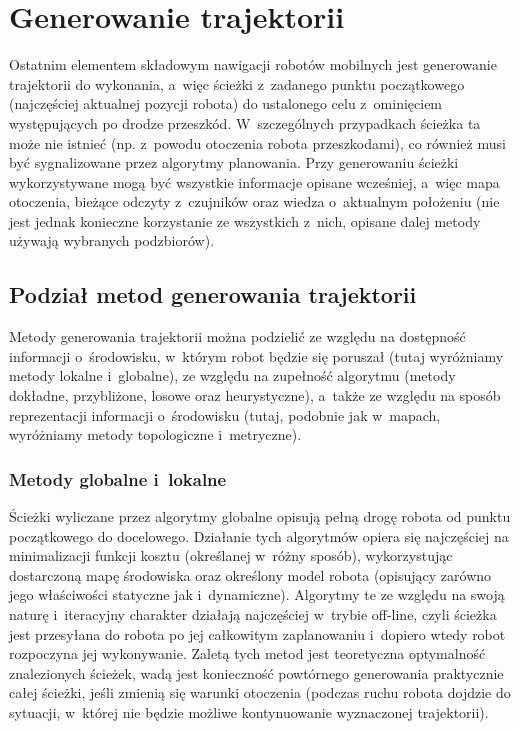 \section{Generowanie trajektorii}

Ostatnim elementem składowym nawigacji robotów mobilnych jest generowanie trajektorii
do wykonania, a~więc ścieżki z~zadanego punktu początkowego (najczęściej aktualnej
pozycji robota) do ustalonego celu z~ominięciem występujących po drodze przeszkód.
W~szczególnych przypadkach ścieżka ta może nie istnieć (np. z~powodu otoczenia robota
przeszkodami), co również musi być sygnalizowane przez algorytmy planowania.
Przy generowaniu ścieżki wykorzystywane mogą być wszystkie informacje opisane wcześniej,
a~więc mapa otoczenia, bieżące odczyty z~czujników oraz wiedza o~aktualnym położeniu
(nie jest jednak konieczne korzystanie ze wszystkich z~nich, opisane dalej metody
używają wybranych podzbiorów).

\subsection{Podział metod generowania trajektorii}

Metody generowania trajektorii można podzielić ze względu na dostępność informacji
o~środowisku, w~którym robot będzie się poruszał (tutaj wyróżniamy metody lokalne
i~globalne), ze względu na zupełność algorytmu (metody dokładne, przybliżone, losowe
oraz heurystyczne), a~także ze względu na sposób reprezentacji informacji o~środowisku
(tutaj, podobnie jak w~mapach, wyróżniamy metody topologiczne i~metryczne).

\subsubsection{Metody globalne i~lokalne}

Ścieżki wyliczane przez algorytmy globalne opisują pełną drogę robota od punktu początkowego
do docelowego. Działanie tych algorytmów opiera się najczęściej na minimalizacji
funkcji kosztu (określanej w~różny sposób), wykorzystując dostarczoną mapę środowiska
oraz określony model robota (opisujący zarówno jego właściwości statyczne jak i~dynamiczne).
Algorytmy te ze względu na swoją naturę i~iteracyjny charakter działają najczęściej
w~trybie off-line, czyli ścieżka jest przesyłana do robota po jej całkowitym
zaplanowaniu i~dopiero wtedy robot rozpoczyna jej wykonywanie. Zaletą tych metod
jest teoretyczna optymalność znalezionych ścieżek, wadą jest konieczność powtórnego generowania
praktycznie całej ścieżki, jeśli zmienią się warunki otoczenia (podczas ruchu robota
dojdzie do sytuacji, w~której nie będzie możliwe kontynuowanie wyznaczonej trajektorii).

